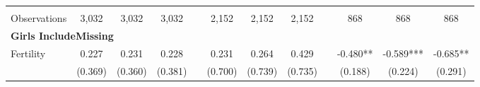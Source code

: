 \begin{landscape}
\begin{table}[htpb!]
\begin{center}
\begin{tabular}{lcccp{2mm}cccp{2mm}ccc}
\begin{footnotesize}\end{footnotesize}&\begin{footnotesize}\end{footnotesize}&\begin{footnotesize}\end{footnotesize}&\begin{footnotesize}\end{footnotesize}&\begin{footnotesize}\end{footnotesize}&\begin{footnotesize}\end{footnotesize}&\begin{footnotesize}\end{footnotesize}&\begin{footnotesize}\end{footnotesize}&\begin{footnotesize}\end{footnotesize}&\begin{footnotesize}\end{footnotesize}&\begin{footnotesize}\end{footnotesize}&\begin{footnotesize}\end{footnotesize}\\Observations&3,032&3,032&3,032&&2,152&2,152&2,152&&868&868&868\\
\multicolumn{12}{l}{\textbf{Girls IncludeMissing}}\\ 
Fertility&0.227&0.231&0.228&&0.231&0.264&0.429&&-0.480**&-0.589***&-0.685**\\
&(0.369)&(0.360)&(0.381)&&(0.700)&(0.739)&(0.735)&&(0.188)&(0.224)&(0.291)\\

\end{tabular}
\end{center}
\end{table}
\end{landscape}

